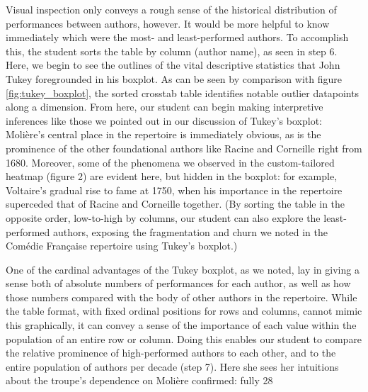 \documentclass[	DIV=calc,%
							paper=a4,%
							fontsize=11pt,%
							twocolumn]{scrartcl}	 					%
\begin{document}
Visual inspection only conveys a rough sense of the historical distribution of performances between authors, however.  It would be more helpful to know immediately which were the most- and least-performed authors.  To accomplish this, the student sorts the table by column (author name), as seen in step 6.  Here, we begin to see the outlines of the vital descriptive statistics that John Tukey foregrounded in his boxplot.  As can be seen by comparison with figure \ref{fig:tukey_boxplot}, the sorted crosstab table identifies notable outlier datapoints along a dimension.  From here, our student can begin making interpretive inferences like those we pointed out in our discussion of Tukey’s boxplot: Molière’s central place in the repertoire is immediately obvious, as is the prominence of the other foundational authors like Racine and Corneille right from 1680.  Moreover, some of the phenomena we observed in the custom-tailored heatmap (figure 2) are evident here, but hidden in the boxplot: for example, Voltaire’s gradual rise to fame at 1750, when his importance in the repertoire superceded that of Racine and Corneille together.  (By sorting the table in the opposite order, low-to-high by columns, our student can also explore the least-performed authors, exposing  the fragmentation and churn we noted in the Comédie Française repertoire using Tukey’s boxplot.)

One of the cardinal advantages of the Tukey boxplot, as we noted, lay in giving a sense both of absolute numbers of performances for each author, as well as how those numbers compared with the body of other authors in the repertoire.  While the table format, with fixed ordinal positions for rows and columns, cannot mimic this graphically, it can convey a sense of the importance of each value within the population of an entire row or column.  Doing this enables our student to compare the relative prominence of high-performed authors to each other, and to the entire population of authors per decade (step 7).  Here she sees her intuitions about the troupe’s dependence on Molière confirmed: fully 28%
\end{document}
